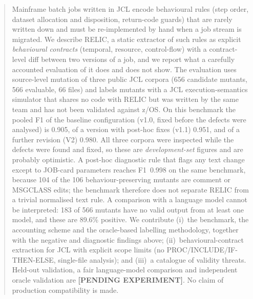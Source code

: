 \begin{abstract}
Mainframe batch jobs written in JCL encode behavioural rules (step order,
dataset allocation and disposition, return-code guards) that are rarely
written down and must be re-implemented by hand when a job stream is migrated.
We describe RELIC, a static extractor of such rules as explicit
\emph{behavioural contracts} (temporal, resource, control-flow) with a
contract-level diff between two versions of a job, and we report what a
carefully accounted evaluation of it does and does not show.
The evaluation uses source-level mutation of three public JCL corpora
(656 candidate mutants, 566 evaluable, 66 files) and labels mutants with a
JCL execution-semantics simulator that shares no code with RELIC but was
written by the same team and has not been validated against z/OS.
On this benchmark the pooled F1 of the baseline configuration (v1.0, fixed before
the defects were analysed) is 0.905, of a version with post-hoc fixes (v1.1) 0.951,
and of a further revision (V2) 0.980.
All three corpora were inspected while the defects were found and fixed, so
these are \emph{development-set} figures and are probably optimistic.
A post-hoc diagnostic rule that flags any text change except to JOB-card
parameters reaches F1~0.998 on the same benchmark, because 104 of the 106
behaviour-preserving mutants are comment or MSGCLASS edits; the benchmark
therefore does not separate RELIC from a trivial normalised text rule.
A comparison with a language model cannot be interpreted: 183 of 566 mutants
have no valid output from at least one model, and these are 89.6\% positive.
We contribute (i)~the benchmark, the accounting scheme and the
oracle-based labelling methodology, together with the negative and diagnostic
findings above; (ii)~behavioural-contract extraction for JCL with explicit
scope limits (no PROC/INCLUDE/IF-THEN-ELSE, single-file analysis); and
(iii)~a catalogue of validity threats. Held-out validation, a fair language-model
comparison and independent oracle validation are
\textbf{[PENDING EXPERIMENT]}. No claim of production compatibility is made.
\end{abstract}
